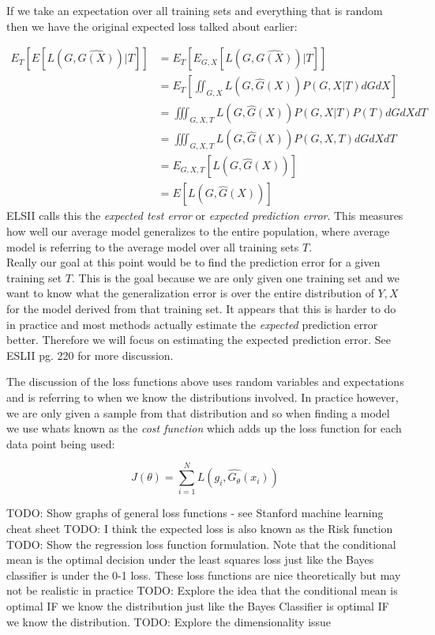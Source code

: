 If we take an expectation over all training sets and everything that is random then we have the original expected loss talked about earlier:

\begin{equation}
\begin{split}
E_{T}[E[L(G, \hat{G(X)})|T]] &= E_{T}[E_{G,X}[L(G, \hat{G(X)})|T]] \\
&= E_{T}\left[\iint_{G, X} {L(G, \hat{G}(X)) P(G,X|T) dG dX}\right]\\
&= \iiint_{G, X, T} {L(G, \hat{G}(X)) P(G,X|T) P(T) dG dX dT} \\
&= \iiint_{G, X, T} {L(G, \hat{G}(X)) P(G,X,T) dG dX dT}\\
&= E_{G,X,T}[L(G, \hat{G}(X))]\\
&= E[L(G, \hat{G}(X))]
\end{split}
\end{equation}
ELSII calls this the \emph{expected test error} or \emph{expected prediction error}. This measures how well our average model generalizes to the entire population, where average model is referring to the average model over all training sets $T$. \\

Really our goal at this point would be to find the prediction error for a given training set $T$. This is the goal because we are only given one training set and we want to know what the generalization error is over the entire distribution of $Y, X$ for the model derived from that training set. It appears that this is harder to do in practice and most methods actually estimate the \emph{expected} prediction error better. Therefore we will focus on estimating the expected prediction error. See ESLII pg. 220 for more discussion.

The discussion of the loss functions above uses random variables and expectations and is referring to when we know the distributions involved. In practice however, we are only given a sample from that distribution and so when finding a model we use whats known as the \emph{cost function} which adds up the loss function for each data point being used:

\begin{equation}
J(\theta) = \sum_{i=1}^{N}{L(g_i, \hat{G_\theta}(x_i))}
\end{equation}



\noindent TODO: Show graphs of general loss functions - see Stanford machine learning cheat sheet \newline
TODO: I think the expected loss is also known as the Risk function \newline
TODO: Show the regression loss function formulation. Note that the conditional mean is the optimal decision under the least squares loss just like the Bayes classifier is under the 0-1 loss. These loss functions are nice theoretically but may not be realistic in practice \newline
TODO: Explore the idea that the conditional mean is optimal IF we know the distribution just like the Bayes Classifier is optimal IF we know the distribution. \newline
TODO: Explore the dimensionality issue

